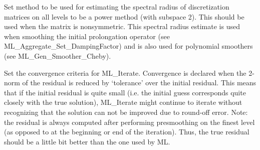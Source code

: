 

\vspace{2em}
{ \hrulefill}
\vspace{1em}

Set method to be used for estimating the spectral 
radius of discretization matrices on all levels
to be a power method (with subspace 2).
This should be used when the matrix is nonsymmetric.
This spectral radius estimate is used when smoothing
the initial prolongation operator  (see ML\_Aggregate\_Set\_DampingFactor)
and is also used for polynomial smoothers
(see ML\_Gen\_Smoother\_Cheby).

\vspace{2em}
{ \hrulefill}
\vspace{1em}




\vspace{2em}
{ \hrulefill}
\vspace{1em}

Set the convergence criteria for ML\_Iterate. Convergence is declared when the 2-norm
of the residual is reduced by `tolerance' over the initial residual. This means that
if the initial residual is quite small (i.e. the initial guess corresponds quite
closely with the true solution), ML\_Iterate might continue to iterate without
recognizing that the solution can not be improved due to round-off error.
Note: the residual is always computed after performing presmoothing on the finest level
(as opposed to at the beginning or end of the iteration). Thus, the true residual should be a
little bit better than the one used by ML.

\vspace{2em}
{ \hrulefill}
\vspace{1em}

